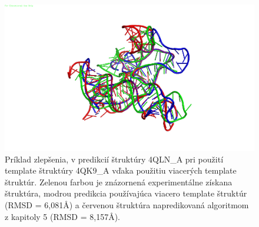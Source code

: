 \begin{figure}%
\includegraphics[width=\textwidth]{../img/success}
\caption{Príklad zlepšenia, v predikcií štruktúry 4QLN\_A pri použití template štruktúry 4QK9\_A vďaka použitiu viacerých template štruktúr. Zelenou farbou je znázornená experimentálne získana štruktúra, modrou predikcia používajúca viacero template štruktúr (RMSD = 6,081Å) a červenou štruktúra napredikovaná algoritmom z kapitoly 5 (RMSD = 8,157Å). }
\label{obr06.01}
\end{figure}
